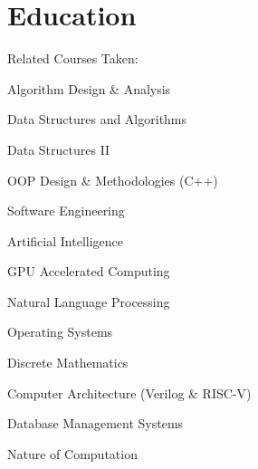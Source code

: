 \documentclass[]{m abbas resume' 2022}
\begin{document}
\hfill
\begin{minipage}[t]{0.51\textwidth} 
    


\section{Education} 
 
    Related Courses Taken:
    \vspace{0.23cm}
    \begin{tightemize}
        \item Algorithm Design \& Analysis
        \item Data Structures and Algorithms
        \item Data Structures II
        \item OOP Design \& Methodologies (C++)
        \item Software Engineering
        \item Artificial Intelligence
        \item GPU Accelerated Computing
        \item Natural Language Processing
        \item Operating Systems
        \item Discrete Mathematics
        \item Computer Architecture (Verilog \& RISC-V)
        \item Database Management Systems
        \item Nature of Computation
    \end{tightemize}
    
    \sectionsep

\end{minipage}
\end{document}
